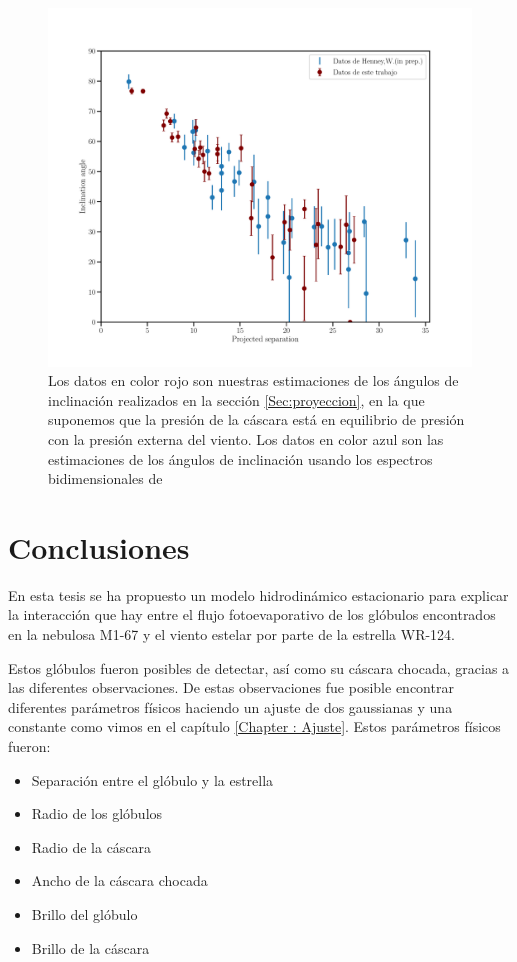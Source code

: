\documentclass{book}
\begin{document}
\begin{figure}[htb]
    \centering
    \includegraphics[width=\textwidth]{Nuevas imagenes finales/W_1.pdf}
    \caption{Los datos en color rojo son nuestras estimaciones de los ángulos de inclinación realizados en la sección \ref{Sec:proyeccion}, en la que suponemos que la presión de la cáscara está en equilibrio de presión con la presión externa del viento. Los datos en color azul son las estimaciones de los ángulos de inclinación usando los espectros bidimensionales de \cite{Zavala:2022}}
    \label{fig:ang_Will}
\end{figure}

\chapter{Conclusiones}

En esta tesis se ha propuesto un modelo hidrodinámico estacionario para explicar la interacción que hay entre el flujo fotoevaporativo de los glóbulos encontrados en la nebulosa M1-67 y el viento estelar por parte de la estrella WR-124. 

Estos glóbulos fueron posibles de detectar, así como su cáscara chocada, gracias a las diferentes observaciones. De estas observaciones fue posible encontrar diferentes parámetros físicos haciendo un ajuste de dos gaussianas y una constante como vimos en el capítulo \ref{Chapter : Ajuste}. Estos parámetros físicos fueron:

\begin{itemize}
    \item Separación entre el glóbulo y la estrella
    \item Radio de los glóbulos
    \item Radio de la cáscara
    \item Ancho de la cáscara chocada
    \item Brillo del glóbulo
    \item Brillo de la cáscara
\end{itemize}
\end{document}
